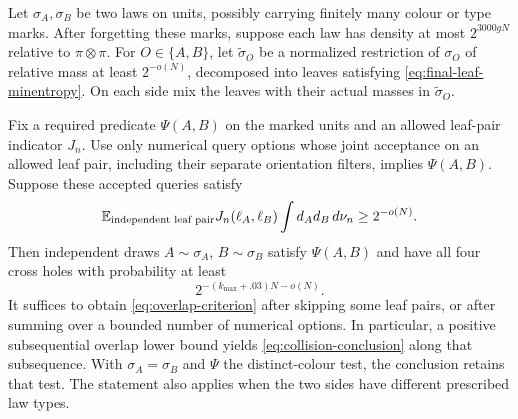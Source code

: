 \begin{proposition}\label{prop:collision}
Let $\sigma_A,\sigma_B$ be two laws on units, possibly carrying
finitely many colour or type marks.  After forgetting these
marks, suppose each law has density at most $2^{3000gN}$
relative to $\pi\otimes\pi$.
For $O\in\{A,B\}$, let $\widetilde\sigma_O$ be a normalized
restriction of $\sigma_O$ of relative mass at least $2^{-o(N)}$,
decomposed into leaves satisfying
\eqref{eq:final-leaf-minentropy}.  On each side mix the leaves
with their actual masses in $\widetilde\sigma_O$.

Fix a required predicate $\Psi(A,B)$ on the marked units and
an allowed leaf-pair indicator $J_n$.
Use only numerical query options whose joint acceptance on
an allowed leaf pair, including their separate orientation
filters, implies $\Psi(A,B)$.  Suppose these accepted queries satisfy
\begin{equation}\label{eq:overlap-criterion}
 \mathbb E_{\text{independent leaf pair}}
       J_n(\ell_A,\ell_B)\int d_A d_B\,d\nu_n\ge 2^{-o(N)}.
\end{equation}
Then independent draws $A\sim\sigma_A$, $B\sim\sigma_B$ satisfy
$\Psi(A,B)$ and have all four cross holes with probability at least
\begin{equation}\label{eq:collision-conclusion}
 2^{-(k_{\max}+.03)N-o(N)}.
\end{equation}
It suffices to obtain \eqref{eq:overlap-criterion} after skipping
some leaf pairs, or after summing over a bounded number of
numerical options.  In particular, a positive subsequential
overlap lower bound yields \eqref{eq:collision-conclusion} along
that subsequence.  With $\sigma_A=\sigma_B$ and
$\Psi$ the distinct-colour test, the conclusion retains that
test.  The statement also applies when the two sides have
different prescribed law types.
\end{proposition}
